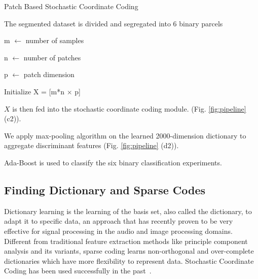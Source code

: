 \begin{algorithm}
	\vspace{1em}
	\caption{Patch Based Stochastic Coordinate Coding}\label{alg:pipeline1}
	
	
	
	The segmented dataset is divided and segregated into 6 binary parcels
	
	 {
		
		m $ \gets $ number of samples
		
		n $ \gets $ number of patches
		
		p $ \gets $ patch dimension
		
		Initialize X = [m*n $ \times $ p]

	$ X $ is then fed into the stochastic coordinate coding module. (Fig. \ref{fig:pipeline} (c2)).
	
	We apply max-pooling algorithm on the learned 2000-dimension dictionary to aggregate discriminant features (Fig. \ref{fig:pipeline} (d2)).
	
	Ada-Boost is used to classify the six binary classification experiments. 
	}
\end{algorithm}


\subsection{Finding Dictionary and Sparse Codes}
\label{sec:dictionary_learning}
Dictionary learning is the learning of the basis set, also called the dictionary, to adapt it to specific data, an approach that has recently proven to be very effective for signal processing in the audio and image processing domains. Different from traditional feature extraction methods like principle component analysis and its variants, sparse coding learns non-orthogonal and over-complete dictionaries which have more flexibility to represent data. Stochastic Coordinate Coding  has been used successfully in the past~\citep{lin2014stochastic,mairal2009online}.

